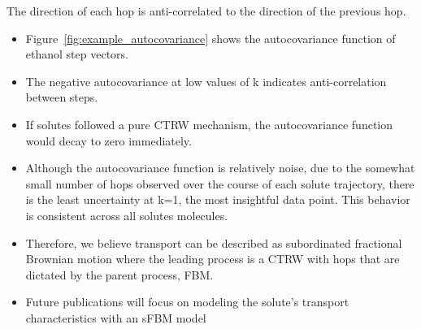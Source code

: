 \documentclass{article}
\begin{document}
  \noindent The direction of each hop is anti-correlated to the direction of the previous hop.
  \begin{itemize}
  	\item Figure~\ref{fig:example_autocovariance} shows the autocovariance function of 
  	ethanol step vectors. %
  	\item The negative autocovariance at low values of k indicates anti-correlation
  	between steps. 
  	\item If solutes followed a pure CTRW mechanism, the autocovariance function would
  	decay to zero immediately.
  	\item Although the autocovariance function is relatively noise, due to the somewhat small
  	number of hops observed over the course of each solute trajectory, there is the least 
  	uncertainty at k=1, the most insightful data point. This behavior is consistent across
  	all solutes molecules. %
  	\item Therefore, we believe transport can be described as subordinated fractional Brownian
  	motion where the leading process is a CTRW with hops that are dictated by the parent
  	process, FBM.
  	\item Future publications will focus on modeling the solute's transport characteristics
  	with an sFBM model
  \end{itemize}

\end{document}
